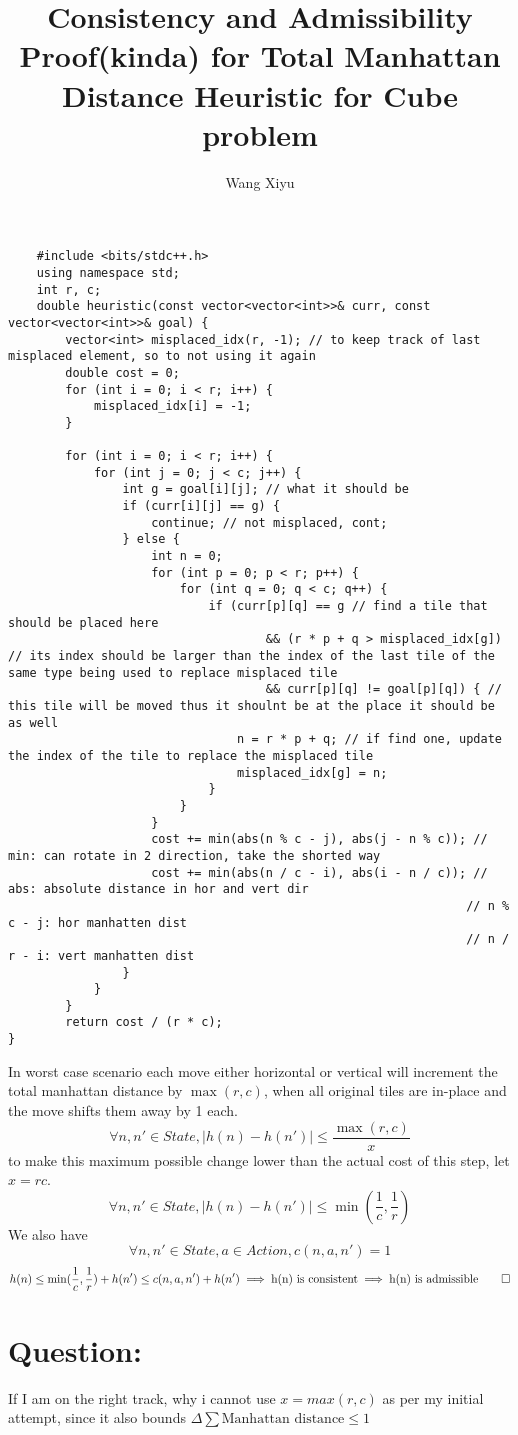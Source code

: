 \documentclass{article}
\begin{document}
\title{Consistency and Admissibility Proof(kinda) for Total Manhattan Distance Heuristic for Cube problem}
\author{Wang Xiyu}
\date{}
\maketitle
\begin{lstlisting}
    #include <bits/stdc++.h>
    using namespace std;
    int r, c;
    double heuristic(const vector<vector<int>>& curr, const vector<vector<int>>& goal) {
        vector<int> misplaced_idx(r, -1); // to keep track of last misplaced element, so to not using it again
        double cost = 0;
        for (int i = 0; i < r; i++) {
            misplaced_idx[i] = -1;
        }

        for (int i = 0; i < r; i++) {
            for (int j = 0; j < c; j++) {
                int g = goal[i][j]; // what it should be
                if (curr[i][j] == g) {
                    continue; // not misplaced, cont;
                } else {
                    int n = 0; 
                    for (int p = 0; p < r; p++) {
                        for (int q = 0; q < c; q++) {
                            if (curr[p][q] == g // find a tile that should be placed here
                                    && (r * p + q > misplaced_idx[g]) // its index should be larger than the index of the last tile of the same type being used to replace misplaced tile
                                    && curr[p][q] != goal[p][q]) { // this tile will be moved thus it shoulnt be at the place it should be as well
                                n = r * p + q; // if find one, update the index of the tile to replace the misplaced tile
                                misplaced_idx[g] = n;
                            } 
                        }
                    }
                    cost += min(abs(n % c - j), abs(j - n % c)); // min: can rotate in 2 direction, take the shorted way
                    cost += min(abs(n / c - i), abs(i - n / c)); // abs: absolute distance in hor and vert dir
                                                                // n % c - j: hor manhatten dist
                                                                // n / r - i: vert manhatten dist
                }
            }
        }
        return cost / (r * c);
}
\end{lstlisting}
\noindent In worst case scenario each move either horizontal or vertical will increment the total manhattan distance by $\max(r, c)$, 
when all original tiles are in-place and the move shifts them away by 1 each. 
\[\forall n, n' \in State, |h(n) - h(n')| \leq \frac{\max(r, c)}{x} \]
to make this maximum possible change lower than the actual cost of this step,
let $x = rc$. 
\[\forall n, n' \in State, |h(n) - h(n')| \leq \min(\frac{1}{c}, \frac{1}{r})\]
We also have 
\[\forall n, n' \in State, a \in Action, c(n, a, n') = 1\]
\[h(n) \leq \min(\frac{1}{c}, \frac{1}{r}) + h(n') \leq c(n, a, n') + h(n') \implies \text{h(n) is consistent} \implies \text{h(n) is admissible} \qed\] 
\section*{Question:}
If I am on the right track, why i cannot use $x = max(r, c)$ as per my initial attempt, since it also bounds $\Delta \sum \text{Manhattan distance} \leq 1$
\end{document}
